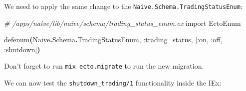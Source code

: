 \documentclass[
  oneside]{book}
\newenvironment{Shaded}{\begin{snugshade}}{\end{snugshade}}
\newcommand{\CommentTok}[1]{\textcolor[rgb]{0.56,0.35,0.01}{\textit{#1}}}
\newcommand{\ConstantTok}[1]{\textcolor[rgb]{0.56,0.35,0.01}{#1}}
\newcommand{\FunctionTok}[1]{\textcolor[rgb]{0.13,0.29,0.53}{\textbf{#1}}}
\newcommand{\ImportTok}[1]{#1}
\newcommand{\NormalTok}[1]{#1}
\newcommand{\OperatorTok}[1]{\textcolor[rgb]{0.81,0.36,0.00}{\textbf{#1}}}
\newcommand{\OtherTok}[1]{\textcolor[rgb]{0.56,0.35,0.01}{#1}}
\newcommand{\VariableTok}[1]{\textcolor[rgb]{0.00,0.00,0.00}{#1}}
\begin{document}
We need to apply the same change to the \texttt{Naive.Schema.TradingStatusEnum}:

\begin{Shaded}
\begin{Highlighting}[]
\CommentTok{\# /apps/naive/lib/naive/schema/trading\_status\_enum.ex}
\ImportTok{import} \ConstantTok{EctoEnum}

\NormalTok{defenum}\FunctionTok{(}\ConstantTok{Naive}\OperatorTok{.}\ConstantTok{Schema}\OperatorTok{.}\ConstantTok{TradingStatusEnum}\NormalTok{, }\VariableTok{:trading\_status}\NormalTok{, }\OtherTok{[}\VariableTok{:on}\NormalTok{, }\VariableTok{:off}\NormalTok{, }\VariableTok{:shutdown}\OtherTok{]}\FunctionTok{)}
\end{Highlighting}
\end{Shaded}

Don't forget to run \texttt{mix\ ecto.migrate} to run the new migration.

We can now test the \texttt{shutdown\_trading/1} functionality inside the IEx:
\end{document}
